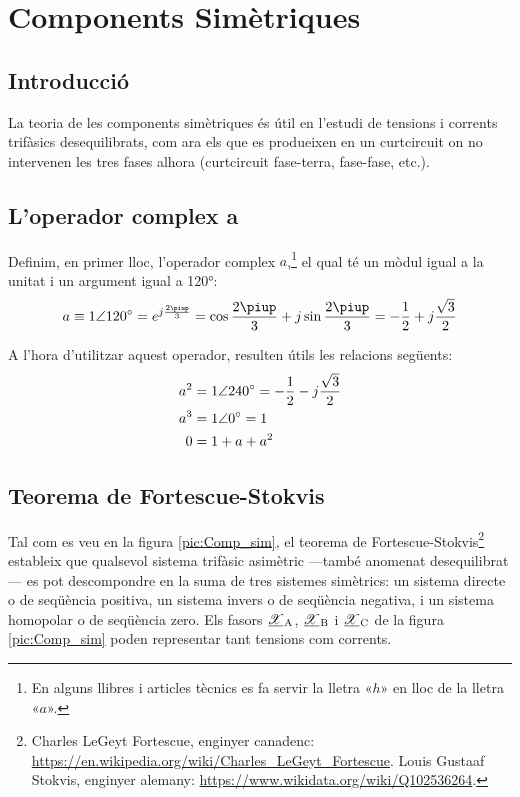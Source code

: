 
\chapter{Components Simètriques}  \label{sec:ch-comp-sim}

\section{Introducció}
La teoria de les components simètriques és útil en l'estudi de
tensions i corrents trifàsics
 desequilibrats, com ara els que es produeixen en un curtcircuit on no intervenen les tres
 fases alhora (curtcircuit fase-terra, fase-fase, etc.).

\section{L'operador complex a}

Definim, en primer lloc, l'operador complex $a$,\footnote{En alguns llibres i articles tècnics es fa servir la lletra «$h$» en lloc de la lletra «$a$».} el qual té un mòdul
igual a la unitat i un argument igual a \ang{120}: \begin{equation}
   a \equiv \complexnum{1:120} = e^{j\frac{2\piup}{3}} =
   \cos \frac{2\piup}{3} + j \sin \frac{2\piup}{3} = - \frac{1}{2} + j \frac{\sqrt{3}}{2}
\end{equation}

A l'hora d'utilitzar aquest operador, resulten útils les relacions
següents:
\begin{subequations}
\begin{align}
    a^2 &= \complexnum{1:240}= - \frac{1}{2} - j \frac{\sqrt{3}}{2} \\
    a^3 &= \complexnum{1:0} = 1 \\
  	0 &=   1+ a + a^2 
 \end{align}
\end{subequations}

\section{\texorpdfstring{Teorema de Fortescue-Stokvis}{Teorema de Fortescue-Stokvis}}

Tal com es veu en la figura \vref{pic:Comp_sim}, el teorema de Fortescue-Stokvis\footnote{Charles LeGeyt Fortescue, enginyer canadenc: \href{https://en.wikipedia.org/wiki/Charles_LeGeyt_Fortescue}{https:/\!\!/en.wikipedia.org/wiki/Charles\_LeGeyt\_Fortescue}. Louis Gustaaf Stokvis, enginyer alemany: \href{https://www.wikidata.org/wiki/Q102536264}{https:/\!\!/www.wikidata.org/wiki/Q102536264}.}
estableix que qualsevol sistema trifàsic asimètric ---també anomenat
desequilibrat---  es pot descompondre  en la suma de tres sistemes
simètrics: un sistema directe o de seqüència positiva, un sistema
invers o de seqüència negativa, i un sistema homopolar o de
seqüència zero. Els fasors $\cmplx{\mathscr{X}}\ped{A}$,
$\cmplx{\mathscr{X}}\ped{B}$ i $\cmplx{\mathscr{X}}\ped{C}$ de la figura \ref{pic:Comp_sim} poden representar tant
tensions com corrents.

